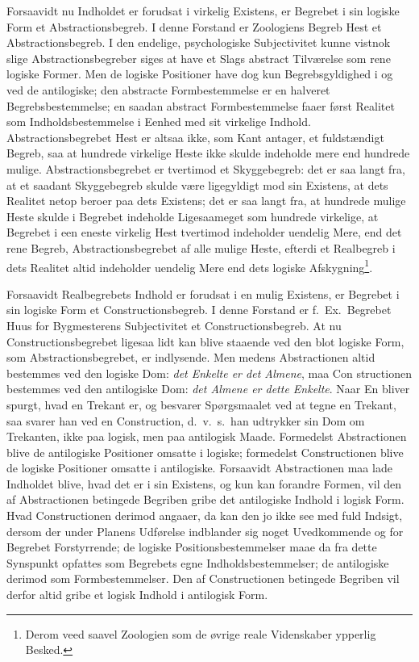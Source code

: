 \documentclass[12pt]{book}
\newcommand{\opage}[1]{\marginnote{\footnotesize\textit{[#1]}}}
\begin{document}
Forsaavidt nu Indholdet er forudsat i virkelig Existens, er Begrebet i sin logiske Form et
Abstractionsbegreb. I denne Forstand er Zoologiens Begreb Hest et Abstractionsbegreb. I den
endelige, psychologiske Subjectivitet kunne vistnok slige Abstractionsbegreber siges at have et
Slags abstract Tilværelse som rene logiske Former. Men de logiske Positioner have dog kun
Begrebsgyldighed i og ved de antilogiske; den abstracte Formbestemmelse er en halveret
Begrebsbestemmelse; en saadan abstract Formbestemmelse faaer først Realitet som
Indholdsbestemmelse i Eenhed med sit virkelige Indhold. Abstractionsbegrebet Hest er altsaa
ikke, som Kant antager, et fuldstændigt Begreb, saa at hundrede virkelige Heste ikke skulde
indeholde mere end hundrede mulige. Abstractionsbegrebet er tvertimod et Skyggebegreb: det er
saa langt fra, at et saadant Skyggebegreb skulde være ligegyldigt mod sin Existens, at dets
Realitet netop beroer paa dets Existens; det er saa langt fra, at hundrede mulige Heste skulde i
Begrebet indeholde Ligesaameget som hundrede virkelige, at Begrebet i een eneste virkelig Hest
tvertimod indeholder uendelig Mere, end det rene Begreb, Abstractionsbegrebet af alle mulige
Heste, efterdi et Realbegreb i dets Realitet altid indeholder uendelig Mere end dets logiske
Afskygning\footnote{Derom veed saavel Zoologien som de øvrige reale Videnskaber ypperlig
Besked.}.

Forsaavidt Realbegrebets Indhold er forudsat i en mulig Existens, er Begrebet i sin logiske Form
et Constructionsbegreb. I denne Forstand er f.\ Ex.\ Begrebet Huus for Bygmesterens
Subjectivitet et Constructionsbegreb. At nu Constructionsbegrebet ligesaa lidt kan blive
staaende ved den blot logiske Form, som Abstractionsbegrebet, er indlysende. Men medens
Abstractionen altid bestemmes ved den logiske Dom: \emph{det Enkelte er det Almene}, maa Con%
\opage{164} structionen bestemmes ved den antilogiske Dom: \emph{det Almene er dette Enkelte}. Naar En
bliver spurgt, hvad en Trekant er, og besvarer Spørgsmaalet ved at tegne en Trekant, saa svarer
han ved en Construction, d.\ v.\ s.\ han udtrykker sin Dom om Trekanten, ikke paa logisk, men
paa antilogisk Maade. Formedelst Abstractionen blive de antilogiske Positioner omsatte i
logiske; formedelst Constructionen blive de logiske Positioner omsatte i antilogiske.
Forsaavidt Abstractionen maa lade Indholdet blive, hvad det er i sin Existens, og kun kan
forandre Formen, vil den af Abstractionen betingede Begriben gribe det antilogiske Indhold i
logisk Form. Hvad Constructionen derimod angaaer, da kan den jo ikke see med fuld Indsigt,
dersom der under Planens Udførelse indblander sig noget Uvedkommende og for Begrebet
Forstyrrende; de logiske Positionsbestemmelser maae da fra dette Synspunkt opfattes som
Begrebets egne Indholdsbestemmelser; de antilogiske derimod som Formbestemmelser. Den af
Constructionen betingede Begriben vil derfor altid gribe et logisk Indhold i antilogisk Form.
\end{document}
